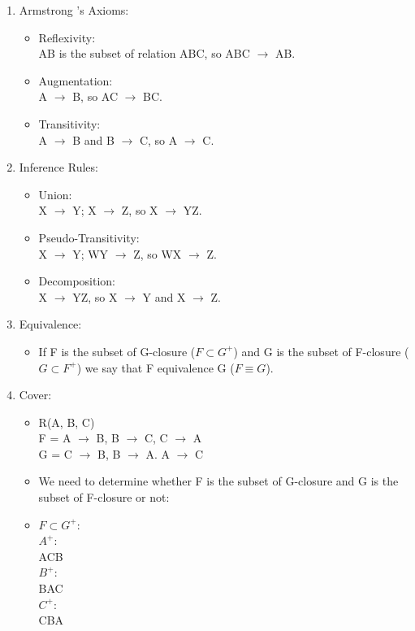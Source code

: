 \documentclass[10pt]{article}
\newcommand{\rarrow}{\rightarrow}
\begin{document}
\begin{enumerate}
	\item Armstrong 's Axioms: \\
	
	\begin{itemize}
		\item Reflexivity: \\
		AB is the subset of relation ABC, so ABC $\rarrow$ AB.
		
		\item Augmentation: \\
		A $\rarrow$ B, so AC $\rarrow$ BC.

		\item Transitivity: \\
		A $\rarrow$ B and B $\rarrow$ C, so A $\rarrow$ C.
	\end{itemize}

	\item Inference Rules: \\
	
	\begin{itemize}
		\item Union: \\
		X $\rarrow$ Y; X $\rarrow$ Z, so X $\rarrow$ YZ.

		\item Pseudo-Transitivity: \\
		X $\rarrow$ Y; WY $\rarrow$ Z, so WX $\rarrow$ Z.

		\item Decomposition: \\
		X $\rarrow$ YZ, so X $\rarrow$ Y and X $\rarrow$ Z.
	\end{itemize}

	\item Equivalence:
	
	\begin{itemize}
		\item If F is the subset of G-closure ($F \subset G^{+}$) and G is the subset of F-closure ($G \subset F^{+}$) we say that F equivalence G ($F \equiv G$).
	\end{itemize}

	\item Cover:
	
	\begin{itemize}
		\item R(A, B, C) \\
			  F = {A $\rarrow$ B, B $\rarrow$ C, C $\rarrow$ A} \\
			  G = {C $\rarrow$ B, B $\rarrow$ A. A $\rarrow$ C} \\
		\item We need to determine whether F is the subset of G-closure and G is the subset of F-closure or not:
		\item 	$F \subset G^{+}$: \\
			 	$A^{+}$: \\
			  	ACB \\
			  	$B^{+}$: \\
				BAC \\
				$C^{+}$: \\
				CBA \\
		

\end{itemize}
\end{enumerate}
\end{document}
